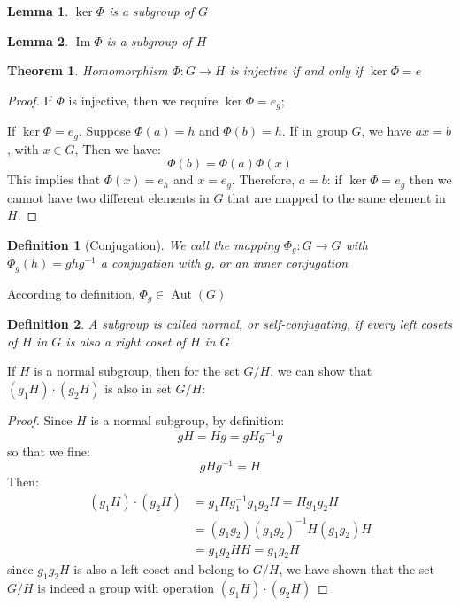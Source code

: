 \documentclass{amsart}
\newtheorem{definition}{Definition}
\newtheorem{theorem}{Theorem}
\newtheorem{lemma}{Lemma}
\DeclareMathOperator{\Aut}{Aut}
\DeclareMathOperator{\Image}{Im}
\begin{document}
\begin{lemma}
    $\ker\Phi$ is a subgroup of $G$
\end{lemma}
\begin{lemma}
    $\Image\Phi$ is a subgroup of $H$
\end{lemma}

\vspace{10pt}

\begin{theorem}
    Homomorphism $\Phi\colon G\to H$ is injective if and only if $\ker \Phi = e$
\end{theorem}
\begin{proof}
    If $\Phi$ is injective, then we require $\ker \Phi = e_g$; 

    If $\ker \Phi = e_g$. Suppose $\Phi(a) = h$ and $\Phi(b) = h$. If in group $G$, we have $ax = b$, with $x\in G$, 
    Then we have:
    \[  
        \Phi(b) = \Phi(a)\Phi(x)    
    \]
    This implies that $\Phi(x)=e_h$ and $x = e_g$. Therefore, $a = b$: if $\ker \Phi = e_g$ then we cannot have
    two different elements in $G$ that are mapped to the same element in $H$.
\end{proof}

\vspace{10pt}

\begin{definition}
    [Conjugation]
    We call the mapping $\Phi_g\colon G\to G$ with $\Phi_g(h) = ghg^{-1}$ a conjugation with $g$, or an \emph{inner conjugation}
\end{definition}
According to definition, $\Phi_g \in \Aut(G)$

\begin{definition}
    A subgroup is called normal, or self-conjugating, if every left cosets of $H$ in $G$ is also a right coset of $H$ in $G$
\end{definition}
If $H$ is a normal subgroup, then for the set $G/H$, we can show that $(g_1 H)\cdot(g_2 H)$ is also in 
set $G/H$:
\begin{proof}
    Since $H$ is a normal subgroup, by definition: 
    \[gH = Hg = gHg^{-1}g\] so that we fine:
    \[gHg^{-1} = H\]
    Then:
    \begin{align*}
        (g_1 H)\cdot(g_2 H) &= g_1 H g_1^{-1}g_1 g_2 H = H g_1 g_2 H \\
            &= (g_1g_2)(g_1g_2)^{-1} H (g_1g_2) H \\
            &= g_1g_2 H H = g_1 g_2 H 
    \end{align*}
    since $g_1 g_2 H$ is also a left coset and belong to $G/H$, we have shown that the set $G/H$ is indeed a group with 
    operation $(g_1 H)\cdot(g_2 H)$
\end{proof}
\end{document}
